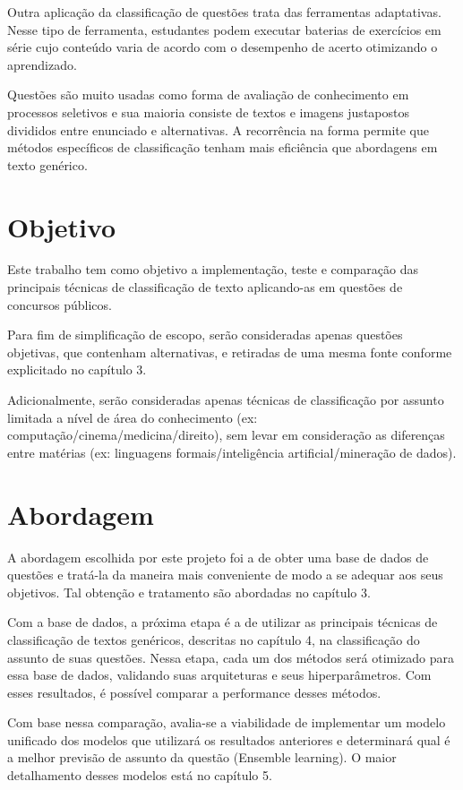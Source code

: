 Outra aplicação da classificação de questões trata das ferramentas adaptativas. Nesse tipo de ferramenta, estudantes podem executar baterias de exercícios em série cujo conteúdo varia de acordo com o desempenho de acerto otimizando o aprendizado.

Questões são muito usadas como forma de avaliação de conhecimento em processos seletivos e sua maioria consiste de textos e imagens justapostos divididos entre enunciado e alternativas. A recorrência na forma permite que métodos específicos de classificação tenham mais eficiência que abordagens em texto genérico.

\section{Objetivo}
Este trabalho tem como objetivo a implementação, teste e comparação das principais técnicas de classificação de texto aplicando-as em questões de concursos públicos.

Para fim de simplificação de escopo, serão consideradas apenas questões objetivas, que contenham alternativas, e retiradas de uma mesma fonte conforme explicitado no capítulo 3.

Adicionalmente, serão consideradas apenas técnicas de classificação por assunto limitada a nível de área do conhecimento (ex: computação/cinema/medicina/direito), sem levar em consideração as diferenças entre matérias (ex: linguagens formais/inteligência artificial/mineração de dados).

\section{Abordagem}
A abordagem escolhida por este projeto foi a de obter uma base de dados de questões e tratá-la da maneira mais conveniente de modo a se adequar aos seus objetivos. Tal obtenção e tratamento são abordadas no capítulo 3.

Com a base de dados, a próxima etapa é a de utilizar as principais técnicas de classificação de textos genéricos, descritas no capítulo 4, na classificação do assunto de suas questões. Nessa etapa, cada um dos métodos será otimizado para essa base de dados, validando suas arquiteturas e seus hiperparâmetros. Com esses resultados, é possível comparar a performance desses métodos.

Com base nessa comparação, avalia-se a viabilidade de implementar um modelo unificado dos modelos que utilizará os resultados anteriores e determinará qual é a melhor previsão de assunto da questão (Ensemble learning). O maior detalhamento desses modelos está no capítulo 5.

